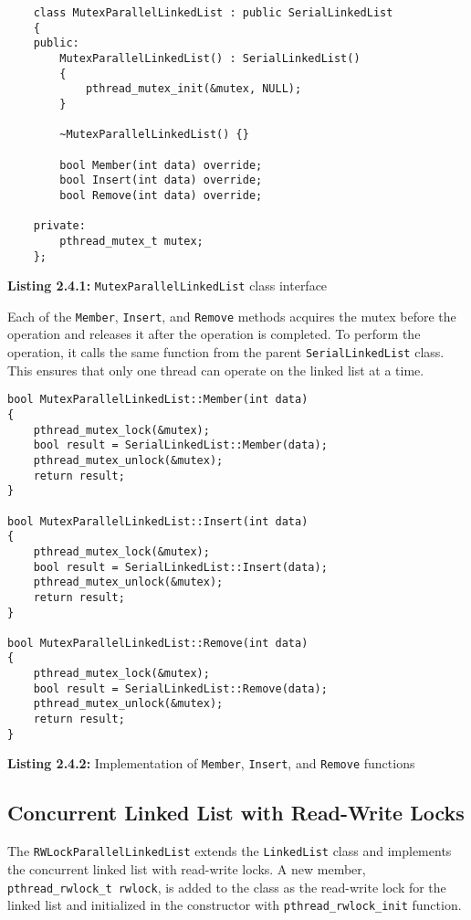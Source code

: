\documentclass[a4paper,12pt]{article}
\begin{document}
\begin{lstlisting}
    class MutexParallelLinkedList : public SerialLinkedList
    {
    public:
        MutexParallelLinkedList() : SerialLinkedList()
        {
            pthread_mutex_init(&mutex, NULL);
        }
    
        ~MutexParallelLinkedList() {}
    
        bool Member(int data) override;
        bool Insert(int data) override;
        bool Remove(int data) override;
    
    private:
        pthread_mutex_t mutex;
    };
\end{lstlisting}
\begin{center}
    \textbf{Listing 2.4.1:} \lstinline|MutexParallelLinkedList| class interface
\end{center}

Each of the \lstinline|Member|, \lstinline|Insert|, and \lstinline|Remove| methods acquires the mutex before the operation and releases it after the operation is completed. To perform the operation, it calls the same function from the parent \lstinline|SerialLinkedList| class. This ensures that only one thread can operate on the linked list at a time.

\begin{lstlisting}
bool MutexParallelLinkedList::Member(int data)
{
    pthread_mutex_lock(&mutex);
    bool result = SerialLinkedList::Member(data);
    pthread_mutex_unlock(&mutex);
    return result;
}

bool MutexParallelLinkedList::Insert(int data)
{
    pthread_mutex_lock(&mutex);
    bool result = SerialLinkedList::Insert(data);
    pthread_mutex_unlock(&mutex);
    return result;
}

bool MutexParallelLinkedList::Remove(int data)
{
    pthread_mutex_lock(&mutex);
    bool result = SerialLinkedList::Remove(data);
    pthread_mutex_unlock(&mutex);
    return result;
}
\end{lstlisting}
\begin{center}
    \textbf{Listing 2.4.2:} Implementation of \lstinline|Member|, \lstinline|Insert|, and \lstinline|Remove| functions
\end{center}

\subsection{Concurrent Linked List with Read-Write Locks}

The \lstinline|RWLockParallelLinkedList| extends the \lstinline|LinkedList| class and implements the concurrent linked list with read-write locks. A new member, \lstinline|pthread_rwlock_t rwlock|, is added to the class as the read-write lock for the linked list and initialized in the constructor with \lstinline|pthread_rwlock_init| function.
\end{document}
